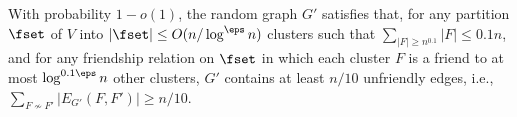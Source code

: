 

\begin{lemma} \label{lem:small}
With probability $1-o(1)$, the random graph $G'$ satisfies that, for any partition $\fset$ of $V$ into $|\fset|\le O(n/\log^{\eps} n)$ clusters such that $\sum_{|F|\ge n^{0.1}}|F|\le 0.1n$, and for any friendship relation on $\fset$ in which each cluster $F$ is a friend to at most $\log^{0.1 \eps} n$ other clusters, $G'$ contains at least $n/10$ unfriendly edges, i.e., $\sum_{F\not\sim F'}|E_{G'}(F,F')|\ge n/10$.
\end{lemma}

